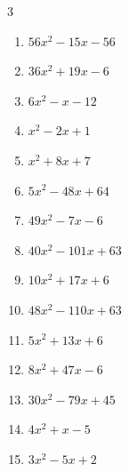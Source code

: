 \begin{multicols}{3}
\begin{enumerate}
  \item $56x^{2}-15x-56$

        \phantom{$=(7x-8)(8x+7)$}

  \item $36x^{2}+19x-6$

        \phantom{$=(4x+3)(9x-2)$}

  \item $6x^{2}-x-12$

        \phantom{$=(3x+4)(2x-3)$}

  \item $x^{2}-2x+1$


  \item $x^{2}+8x+7$

        \phantom{$=(x+1)(x+7)$}

  \item $5x^{2}-48x+64$

        \phantom{$=(5x-8)(x-8)$}

  \item $49x^{2}-7x-6$

        \phantom{$=(7x-3)(7x+2)$}

  \item $40x^{2}-101x+63$

        \phantom{$=(5x-7)(8x-9)$}

  \item $10x^{2}+17x+6$

        \phantom{$=(2x+1)(5x+6)$}

\columnbreak %

  \item $48x^{2}-110x+63$

        \phantom{$=(6x-7)(8x-9)$}

  \item $5x^{2}+13x+6$

        \phantom{$=(x+2)(5x+3)$}

  \item $8x^{2}+47x-6$

        \phantom{$=(8x-1)(x+6)$}

  \item $30x^{2}-79x+45$

        \phantom{$=(5x-9)(6x-5)$}

  \item $4x^{2}+x-5$

        \phantom{$=(x-1)(4x+5)$}

  \item $3x^{2}-5x+2$


\end{enumerate}
\end{multicols}

